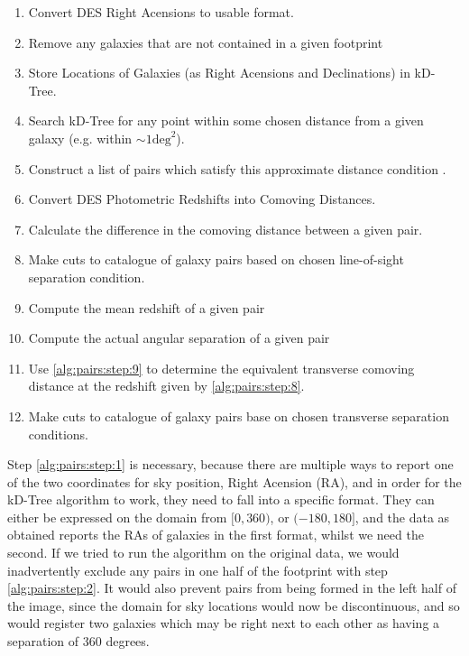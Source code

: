 \begin{enumerate}%
\item Convert DES Right Acensions to usable format. \label{alg:pairs:step:1}
\item Remove any galaxies that are not contained in a given footprint \label{alg:pairs:step:2}
\item Store Locations of Galaxies (as Right Acensions and Declinations) in kD-Tree. \label{alg:pairs:step:3}
\item Search kD-Tree for any point within some chosen distance from a given galaxy (e.g. within $\sim 1 \text{deg}^2$).\label{alg:pairs:step:4}
\item Construct a list of pairs which satisfy this approximate distance condition . \label{alg:pairs:step:5}
\item Convert DES Photometric Redshifts into Comoving Distances.\label{alg:pairs:step:6}
\item Calculate the difference in the comoving distance between a given pair. \label{alg:pairs:step:7}
\item Make cuts to catalogue of galaxy pairs based on chosen line-of-sight separation condition.\label{alg:pairs:step:8}
\item Compute the mean redshift of a given pair \label{alg:pairs:step:9}
\item Compute the actual angular separation of a given pair \label{alg:pairs:step:10}
\item Use \ref{alg:pairs:step:9} to determine the equivalent transverse comoving distance at the redshift given by \ref{alg:pairs:step:8}. \label{alg:pairs:step:11}
\item Make cuts to catalogue of galaxy pairs base on chosen transverse separation conditions.\label{alg:pairs:step:12} 
\end{enumerate}

\par Step \ref{alg:pairs:step:1} is necessary, because there are multiple ways to report one of the two coordinates for sky position, Right Acension (RA), and in order for the kD-Tree algorithm to work, they need to fall into a specific format. They can either be expressed on the domain from $[0,360)$, or $(-180,180]$, and the data as obtained reports the RAs of galaxies in the first format, whilst we need the second. If we tried to run the algorithm on the original data, we would inadvertently exclude any pairs in one half of the footprint with step \ref{alg:pairs:step:2}. It would also prevent pairs from being formed in the left half of the image, since the domain for sky locations would now be discontinuous, and so would register two galaxies which may be right next to each other as having a separation of 360 degrees. 


